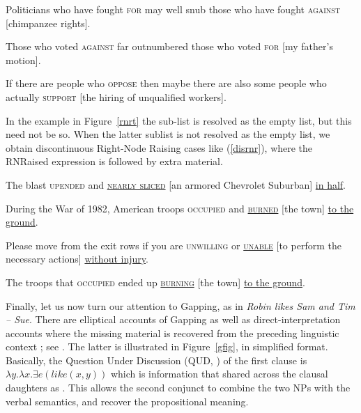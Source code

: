 \documentclass[output=paper
                ,modfonts
                ,nonflat
	        ,collection
	        ,collectionchapter
	        ,collectiontoclongg
 	        ,biblatex
                ,babelshorthands
                ,newtxmath
                ,draftmode
                ,colorlinks, citecolor=brown
]{./langsci/langscibook}
\begin{document}
{\begin{exe}
\begin{xlista}
\ex Politicians who have fought \textsc{for} may well snub those
 who have fought \textsc{against} [chimpanzee rights]. \\
\citep[]{postal94}\addpages

\ex Those who voted \textsc{against} far outnumbered those who
voted  \textsc{for} [my father's motion].\\
\citep[1344]{rodney}


\ex If there are people who \textsc{oppose} then maybe there are also some
  people who actually \textsc{support}  [the hiring of unqualified
  workers].\\
  \citep[]{chavesrnr}

\end{xlista}


\end{exe}




In the example in Figure~\ref{rnrt}  the sub-list  is resolved as the empty list, but this need not be so. When the latter sublist is not resolved as the empty list, we obtain discontinuous Right-Node Raising cases like (\ref{disrnr}), 
where the RNRaised expression is followed by extra material.

\begin{exe}
\ex \begin{xlista}
\ex The blast \textsc{upended} and \underline{\textsc{nearly sliced}} [an armored Chevrolet Suburban] \underline{in half}.

\ex During the War of 1982, American troops
\textsc{occupied}  and \underline{\textsc{burned}} [the town] \underline{to the ground}.

\ex Please move from the exit rows if you are \textsc{unwilling} or \underline{\textsc{unable}}
 [to perform the necessary actions] \underline{without injury}.

\ex The troops that \textsc{occupied} ended up \underline{\textsc{burning}}
[the town] \underline{to the ground}.

\end{xlista}\label{disrnr}
\end{exe}



Finally, let us now turn our attention to Gapping, as in 
\emph{Robin likes Sam and Tim -- Sue}.
There are elliptical accounts of Gapping  \citep{chaves06} as well as direct-interpretation accounts where the missing material is recovered from the preceding linguistic context  \citep{Mouret:06,Abeille:Blbie:Mouret:14,sangheepark}; see . The latter is illustrated in Figure~\ref{gfig}, in simplified format. Basically, the Question Under Discussion (QUD, \citealp{roberts96}) of the first clause is $\lambda y.\lambda x. \exists e(like(x,y))$ which is information that shared across the clausal daughters as .
This allows the second conjunct to combine the two NPs with the verbal semantics, and recover the propositional meaning.

}
\end{document}

